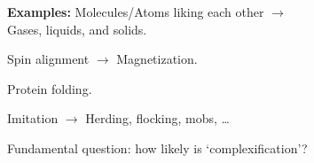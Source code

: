 

   \textbf{Examples:}
       Molecules/Atoms liking each other $\rightarrow$ \\
       \mbox{} \hfill Gases, liquids, and solids.
     
       Spin alignment $\rightarrow$ Magnetization.
      
       Protein folding.
      
       Imitation $\rightarrow$ Herding, flocking, mobs, \ldots
     \medskip

     {
       Fundamental question: how likely is `complexification'?
     }
 



